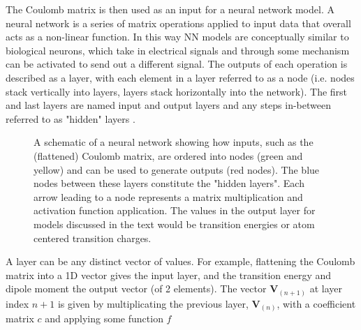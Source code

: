 The Coulomb matrix is then used as an input for a neural network model. A neural 
network is a series of matrix operations applied to input data that overall acts
as a non-linear function. In this way NN models are conceptually similar to biological 
neurons, which take in electrical signals and through some mechanism can be activated
to send out a different signal. The outputs of each operation is described as a 
layer, with each element in a layer referred to as a node (i.e. nodes stack vertically
into layers, layers stack horizontally into the network). The first and last layers 
are named input and output layers and any steps in-between referred to as "hidden" 
layers \cite{Rumelhart1986}.

\begin{figure}
	\centering
	\begin{neuralnetwork}[height=4]
        \hiddenlayer[count=4, bias=false, title=Hidden\\layer 1] \linklayers
        \hiddenlayer[count=3, bias=false, title=Hidden\\layer 2] \linklayers
        \outputlayer[count=2, title=Output\\layer] \linklayers
	\end{neuralnetwork}
	\caption{A schematic of a neural network showing how inputs, such as the
	(flattened) Coulomb matrix, are ordered into nodes (green and yellow) and can
	be used to generate outputs (red nodes). The blue nodes between these layers
	constitute the "hidden layers". Each arrow leading to a node represents a matrix
	multiplication and activation function application. The values in the output
	layer for models discussed in the text would be \Qy transition energies or atom
	centered transition charges.}
	\label{fig:neural_network}
\end{figure}

A layer can be any distinct vector of values. For example, flattening the Coulomb 
matrix into a 1D vector gives the input layer, and the \Qy transition energy and 
dipole moment the output vector (of 2 elements). The vector $\mathbf{V}_{(n+1)}$
at layer index $n+1$ is given by multiplicating the previous layer, $\mathbf{V}_{(n)}$,
with a coefficient matrix $c$ and applying some function $f$

